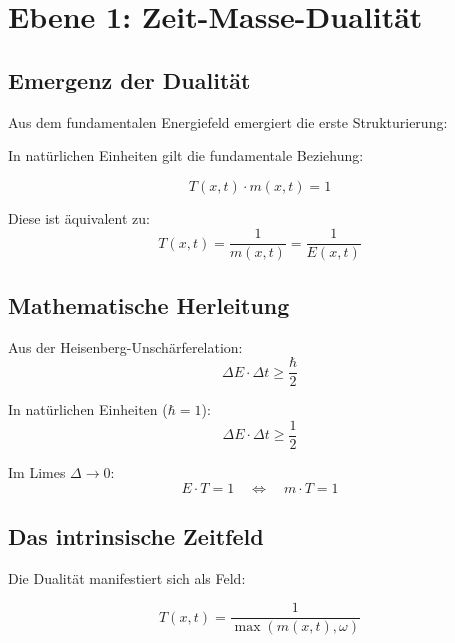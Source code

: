 \section{Ebene 1: Zeit-Masse-Dualität}

\subsection{Emergenz der Dualität}

Aus dem fundamentalen Energiefeld emergiert die erste Strukturierung:

\begin{keyresult}
In natürlichen Einheiten gilt die fundamentale Beziehung:

\begin{equation}
\boxed{T(x,t) \cdot m(x,t) = 1}
\end{equation}

Diese ist äquivalent zu:
\begin{equation}
T(x,t) = \frac{1}{m(x,t)} = \frac{1}{E(x,t)}
\end{equation}
\end{keyresult}

\subsection{Mathematische Herleitung}

Aus der Heisenberg-Unschärferelation:
\begin{equation}
\Delta E \cdot \Delta t \geq \frac{\hbar}{2}
\end{equation}

In natürlichen Einheiten ($\hbar = 1$):
\begin{equation}
\Delta E \cdot \Delta t \geq \frac{1}{2}
\end{equation}

Im Limes $\Delta \to 0$:
\begin{equation}
E \cdot T = 1 \quad \Leftrightarrow \quad m \cdot T = 1
\end{equation}

\subsection{Das intrinsische Zeitfeld}

Die Dualität manifestiert sich als Feld:

\begin{equation}
\boxed{T(x,t) = \frac{1}{\max(m(x,t), \omega)}}
\end{equation}

